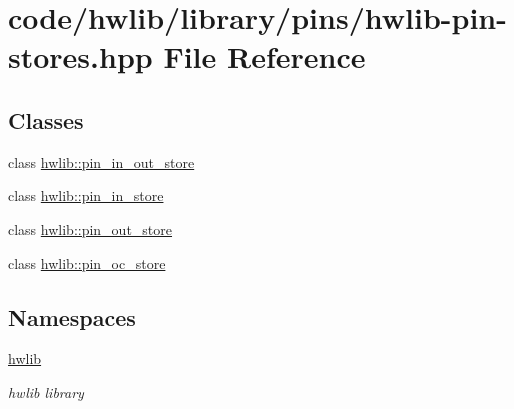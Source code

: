 \hypertarget{hwlib-pin-stores_8hpp}{}\section{code/hwlib/library/pins/hwlib-\/pin-\/stores.hpp File Reference}
\label{hwlib-pin-stores_8hpp}
\subsection*{Classes}
\begin{DoxyCompactItemize}
\item 
class \hyperlink{classhwlib_1_1pin__in__out__store}{hwlib\+::pin\+\_\+in\+\_\+out\+\_\+store}
\item 
class \hyperlink{classhwlib_1_1pin__in__store}{hwlib\+::pin\+\_\+in\+\_\+store}
\item 
class \hyperlink{classhwlib_1_1pin__out__store}{hwlib\+::pin\+\_\+out\+\_\+store}
\item 
class \hyperlink{classhwlib_1_1pin__oc__store}{hwlib\+::pin\+\_\+oc\+\_\+store}
\end{DoxyCompactItemize}
\subsection*{Namespaces}
\begin{DoxyCompactItemize}
\item 
 \hyperlink{namespacehwlib}{hwlib}
\begin{DoxyCompactList}\small\item\em hwlib library \end{DoxyCompactList}\end{DoxyCompactItemize}
